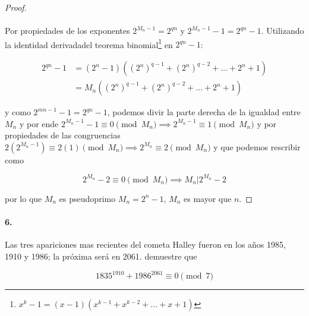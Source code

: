 \documentclass{article}
\begin{document}
\begin{proof}
		\paragraph{} Por propiedades de los exponentes $2^{M_n - 1} = 2^{qn}$ y $2^{M_n - 1} - 1 = 2^{qn} - 1$. Utilizando la identidad derivadadel teorema binomial\footnote{$x^k - 1 = (x-1)(x^{k-1} + x^{k-2} + \dots + x + 1)$} en $2^{qn} - 1$:
		
		\begin{align*}
		2^{qn} - 1 &= (2^n - 1)((2^n)^{q-1} + (2^n)^{q-2} + \dots + 2^n + 1)\\
		&= M_n((2^n)^{q-1} + (2^n)^{q-2} + \dots + 2^n + 1)
		\end{align*}
		
		y como $2^{mn -1} - 1 = 2^{qn} - 1$, podemos divir la parte derecha de la igualdad entre $M_n$ y por ende $2^{M_n - 1} - 1 \equiv 0 \pmod{M_n} \implies 2^{M_n - 1} \equiv 1 \pmod{M_n}$ y por propiedades de las congruencias $2(2^{M_n -1}) \equiv 2(1) \pmod{M_n} \implies 2^{M_n} \equiv 2 \pmod{M_n}$ y que podemos rescribir como
		
		$$2^{M_n} - 2 \equiv 0 \pmod{M_n} \implies M_n | 2^{M_n} - 2$$
		
		por lo que $M_n$ es pseudoprimo $M_n = 2^n - 1$, $M_n$ es mayor que $n$.
	\end{proof}
	
	\paragraph{6.} Las tres apariciones mas recientes del cometa Halley fueron en los años 1985, 1910 y 1986; la próxima será en 2061. demuestre que
	
	$$1835^{1910} + 1986^{2061} \equiv 0 \pmod{7}$$
	
\end{document}
